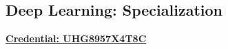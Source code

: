 \subsection{Deep Learning: Specialization}
\vspace{\topsep}
\href{https://www.coursera.org/account/accomplishments/specialization/certificate/UHG8957X4T8C}{\bf Credential: UHG8957X4T8C}

\sectionspace
